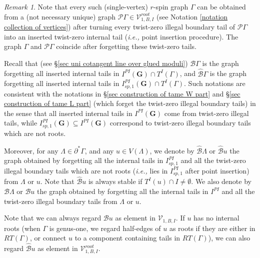 \documentclass[11pt]{amsart}
\theoremstyle{definition}
\theoremstyle{remark}
\newtheorem{rmk}[dummy]{Remark}
\newcommand{\<}{\left<}
\renewcommand{\>}{\right>}
\numberwithin{equation}{section}
\begin{document}
    
\begin{rmk}\label{rmk consistent notation of base}
Note that every such (single-vertex) $r$-spin graph $\Gamma$ can be obtained from a (not necessary unique) graph $\mathcal P\Gamma\in \mathcal V_{1,B,I}^{root}$ (see Notation \ref{notation collection of vertices}) after turning every twist-zero illegal boundary tail of $\mathcal P\Gamma$ into an inserted twist-zero internal tail (\textit{i.e.,} point insertion procedure). The graph $\Gamma$ and $\mathcal P\Gamma$ coincide after forgetting these twist-zero  tails. 

Recall that (see \S \ref{sec uni cotangent line over glued moduli}) $\mathcal B \Gamma$ is the graph forgetting all inserted internal tails in $I^{PI}(\bm G)\cap T^I(\Gamma)$, and $\hat{\mathcal B} \Gamma$ is the graph forgetting all inserted internal tails in $I^{PI}_{sp,1}(\bm G)\cap T^I(\Gamma)$. Such notations are consistent with the notations in \S \ref{sec construction of tame W part} and \S \ref{sec construction of tame L part} (which forget the twist-zero illegal boundary tails) in the sense that all inserted internal tails in $I^{PI}(\bm G)$ come from twist-zero illegal tails, while $I^{PI}_{sp,1}(\bm G)\subseteq I^{PI}(\bm G)$ correspond to twist-zero illegal boundary tails which are not roots.

Moreover, for any $\Lambda\in \partial^* \Gamma$, and any $u\in V(\Lambda)$, we denote by $\hat{\mathcal B}\Lambda$ or $\hat{\mathcal B} u$ the graph obtained by forgetting all the internal tails in $I^{PI}_{sp,1}$ and all the twist-zero illegal boundary tails which are not roots (\textit{i.e.,} lies in $I^{PI}_{sp,1}$ after point insertion) from $\Lambda$ or $u$. Note that $\hat{\mathcal B} u$ is always stable if $T^I(u)\cap I\ne \emptyset$.
We also denote by $\mathcal B \Lambda$ or $\mathcal B u$ the graph obtained by forgetting all the internal tails in $I^{PI}$ and all the twist-zero illegal boundary tails from $\Lambda$ or $u$.

Note that we can always regard $\mathcal B u$ as element in $\mathcal V_{1,B,I}$. If $u$ has no internal roots (when $\Gamma$ is genus-one, we regard half-edges of $u$ as roots if they are either in $RT(\Gamma)$, or connect $u$ to a component containing tails in $RT(\Gamma)$), we can also regard  $\hat{\mathcal B} u$ as element in $\mathcal V_{1,B,I}^{root}$.
\end{rmk}
\end{document}
